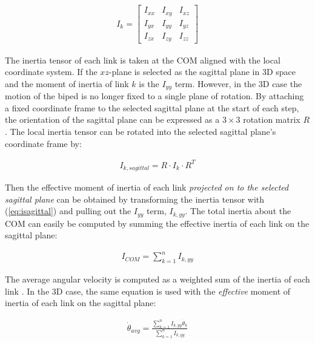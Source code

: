 \begin{equation}
	\begin{aligned}
		{I_k} = \left[ {\begin{array}{*{20}{c}}
{{I_{xx}}}&{{I_{xy}}}&{{I_{xz}}}\\
{{I_{yx}}}&{{I_{yy}}}&{{I_{yz}}}\\
{{I_{zx}}}&{{I_{zy}}}&{{I_{zz}}}
\end{array}} \right]
	\end{aligned}
\end{equation}

The inertia tensor of each link is taken at the COM aligned with the local coordinate system. If the $xz$-plane is selected as the sagittal plane in 3D space and the moment of inertia of link $k$ is the $I_{yy}$ term. However, in the 3D case the motion of the biped is no longer fixed to a single plane of rotation. By attaching a fixed coordinate frame to the selected sagittal plane at the start of each step, the orientation of the sagittal plane can be expressed as a $3\times3$ rotation matrix $R$. The local inertia tensor can be rotated into the selected sagittal plane's coordinate frame by: 

\begin{equation}
	\begin{aligned}
		{I_{k,sagittal}} = R \cdot {I_k} \cdot {R^T}
	\end{aligned}
	\label{eq:isagittal}
\end{equation}

Then the effective moment of inertia of each link \emph{projected on to the selected sagittal plane} can be obtained by transforming the inertia tensor with (\ref{eq:isagittal}) and pulling out the $I_{yy}$ term, $I_{k,yy}$. The total inertia about the COM can easily be computed by summing the effective inertia of each link on the sagittal plane: 

\begin{equation}
	\begin{aligned}
		{I_{COM}} = \sum\limits_{k = 1}^n {{I_{k,yy}}}
	\end{aligned}
	\label{eq:icom_3d}
\end{equation}

The average angular velocity is computed as a weighted sum of the inertia of each link \cite{Wight:2008ii}. In the 3D case, the same equation is used with the \emph{effective} moment of inertia of each link on the sagittal plane: 

\begin{equation}
	\begin{aligned}
		{\dot \theta _{avg}} = \frac{{\sum\limits_{k = 1}^n {{I_{k,yy}}} {{\dot \theta }_k}}}{{\sum\limits_{k = 1}^n {{I_{k,yy}}} }}
	\end{aligned}
	\label{eq:wavg_3d}
\end{equation}

